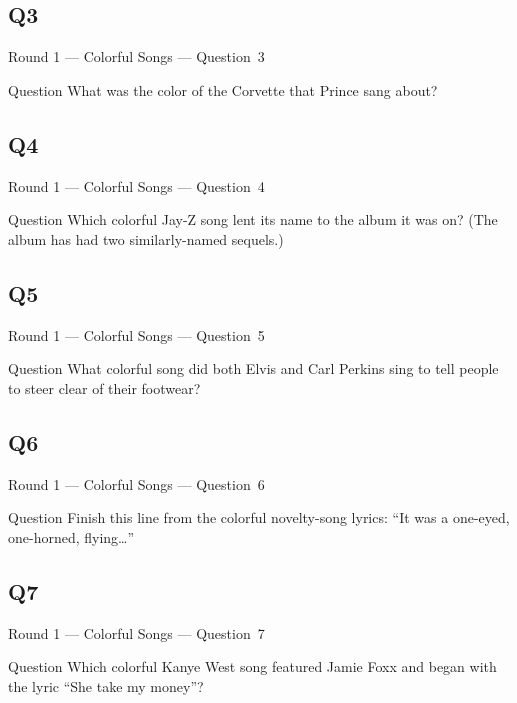 \documentclass[11pt]{beamer}
\begin{document}
\subsection*{Q3}
\begin{frame}[t]{Round 1 --- Colorful Songs --- \mbox{Question 3}}
\vspace{-0.5em}
\begin{block}{Question}
What was the color of the Corvette that Prince sang about?
\end{block}
\end{frame}
\subsection*{Q4}
\begin{frame}[t]{Round 1 --- Colorful Songs --- \mbox{Question 4}}
\vspace{-0.5em}
\begin{block}{Question}
Which colorful Jay-Z song lent its name to the album it was on? (The album has had two similarly-named sequels.)
\end{block}
\end{frame}
\subsection*{Q5}
\begin{frame}[t]{Round 1 --- Colorful Songs --- \mbox{Question 5}}
\vspace{-0.5em}
\begin{block}{Question}
What colorful song did both Elvis and Carl Perkins sing to tell people to steer clear of their footwear?
\end{block}
\end{frame}
\subsection*{Q6}
\begin{frame}[t]{Round 1 --- Colorful Songs --- \mbox{Question 6}}
\vspace{-0.5em}
\begin{block}{Question}
Finish this line from the colorful novelty-song  lyrics: ``It was a one-eyed, one-horned, flying\ldots''
\end{block}
\end{frame}
\subsection*{Q7}
\begin{frame}[t]{Round 1 --- Colorful Songs --- \mbox{Question 7}}
\vspace{-0.5em}
\begin{block}{Question}
Which colorful Kanye West song featured Jamie Foxx and began with the lyric ``She take my money''?
\end{block}
\end{frame}
\end{document}

